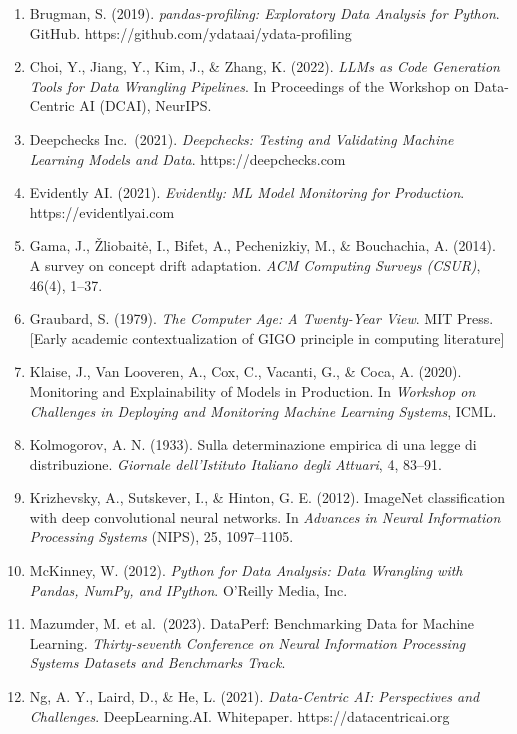 \documentclass{article}
\begin{document}
\begin{enumerate}
\def\labelenumi{\arabic{enumi}.}
\item
  Brugman, S. (2019). \emph{pandas-profiling: Exploratory Data Analysis
  for Python}. GitHub. https://github.com/ydataai/ydata-profiling
\item
  Choi, Y., Jiang, Y., Kim, J., \& Zhang, K. (2022). \emph{LLMs as Code
  Generation Tools for Data Wrangling Pipelines}. In Proceedings of the
  Workshop on Data-Centric AI (DCAI), NeurIPS.
\item
  Deepchecks Inc.~(2021). \emph{Deepchecks: Testing and Validating
  Machine Learning Models and Data}. https://deepchecks.com
\item
  Evidently AI. (2021). \emph{Evidently: ML Model Monitoring for
  Production}. https://evidentlyai.com
\item
  Gama, J., Žliobaitė, I., Bifet, A., Pechenizkiy, M., \& Bouchachia, A.
  (2014). A survey on concept drift adaptation. \emph{ACM Computing
  Surveys (CSUR)}, 46(4), 1--37.
\item
  Graubard, S. (1979). \emph{The Computer Age: A Twenty-Year View}. MIT
  Press. {[}Early academic contextualization of GIGO principle in
  computing literature{]}
\item
  Klaise, J., Van Looveren, A., Cox, C., Vacanti, G., \& Coca, A.
  (2020). Monitoring and Explainability of Models in Production. In
  \emph{Workshop on Challenges in Deploying and Monitoring Machine
  Learning Systems}, ICML.
\item
  Kolmogorov, A. N. (1933). Sulla determinazione empirica di una legge
  di distribuzione. \emph{Giornale dell'Istituto Italiano degli
  Attuari}, 4, 83--91.
\item
  Krizhevsky, A., Sutskever, I., \& Hinton, G. E. (2012). ImageNet
  classification with deep convolutional neural networks. In
  \emph{Advances in Neural Information Processing Systems} (NIPS), 25,
  1097--1105.
\item
  McKinney, W. (2012). \emph{Python for Data Analysis: Data Wrangling
  with Pandas, NumPy, and IPython}. O'Reilly Media, Inc.
\item
  Mazumder, M. et al.~(2023). DataPerf: Benchmarking Data for Machine
  Learning. \emph{Thirty-seventh Conference on Neural Information
  Processing Systems Datasets and Benchmarks Track}.
\item
  Ng, A. Y., Laird, D., \& He, L. (2021). \emph{Data-Centric AI:
  Perspectives and Challenges}. DeepLearning.AI. Whitepaper.
  https://datacentricai.org

\end{enumerate}
\end{document}
